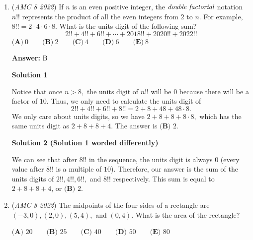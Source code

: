 \begin{enumerate}
\textbf{Solution 4}

Let’s label these $4$ numbers $A$,$B$,$C$, and $D$. 

 
$A$ + $B$ = $42$
$B$ + $C$ = $52$
$C$ + $D$ = $60$

 
We can use elimination to solve this: $A$ - $C$ = $-10$

 and since 

 $D$ + $C$ = $60$

 then

 $A$ + $D$ = $50$

 
Finally, to find the average, divide by $2$. The answer is $25$, or $B$

 -OddPeppyBoots

 


	\item (\textit{AMC 8 2022}) If $n$ is an even positive integer, the $\emph{double factorial}$ notation $n!!$ represents the product of all the even integers from $2$ to $n$. For example, $8!! = 2 \cdot 4 \cdot 6 \cdot 8$. What is the units digit of the following sum? 
 \[2!! + 4!! + 6!! + \cdots + 2018!! + 2020!! + 2022!!\]
$\textbf{(A)} ~0\qquad\textbf{(B)} ~2\qquad\textbf{(C)} ~4\qquad\textbf{(D)} ~6\qquad\textbf{(E)} ~8$

 \textbf{Answer: }B



\textbf{Solution 1}

Notice that once $n>8,$ the units digit of $n!!$ will be $0$ because there will be a factor of $10.$ Thus, we only need to calculate the units digit of 
 \[2!!+4!!+6!!+8!! = 2+8+48+48\cdot8.\] We only care about units digits, so we have $2+8+8+8\cdot8,$ which has the same units digit as $2+8+8+4.$ The answer is $\boxed{\textbf{(B) } 2}.$




\textbf{Solution 2 (Solution 1 worded differently)}

We can see that after $8!!$ in the sequence, the units digit is always $0$ (every value after $8!!$ is a multiple of $10$). Therefore, our answer is the sum of the units digits of $2!!, 4!!, 6!!,$ and $8!!$ respectively. This sum is equal to $2 + 8 + 8 + 4$, or $\boxed{\textbf{(B) } 2}.$



	\item (\textit{AMC 8 2022}) The midpoints of the four sides of a rectangle are $(-3,0), (2,0), (5,4),$ and $(0,4).$ What is the
area of the rectangle? 


 $\textbf{(A) } 20 \qquad \textbf{(B) } 25 \qquad \textbf{(C) } 40 \qquad \textbf{(D) } 50 \qquad \textbf{(E) } 80$


\end{enumerate}

